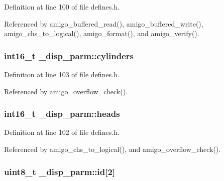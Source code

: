 Definition at line 100 of file defines.\+h.



Referenced by amigo\+\_\+buffered\+\_\+read(), amigo\+\_\+buffered\+\_\+write(), amigo\+\_\+chs\+\_\+to\+\_\+logical(), amigo\+\_\+format(), and amigo\+\_\+verify().

\subsubsection[{\texorpdfstring{cylinders}{cylinders}}]{\setlength{\rightskip}{0pt plus 5cm}int16\+\_\+t \+\_\+disp\+\_\+parm\+::cylinders}\hypertarget{struct__disp__parm_ac4687d407f95a65e86313cde433832a4}{}\label{struct__disp__parm_ac4687d407f95a65e86313cde433832a4}


Definition at line 103 of file defines.\+h.



Referenced by amigo\+\_\+overflow\+\_\+check().

\subsubsection[{\texorpdfstring{heads}{heads}}]{\setlength{\rightskip}{0pt plus 5cm}int16\+\_\+t \+\_\+disp\+\_\+parm\+::heads}\hypertarget{struct__disp__parm_a013e3f25cec51e3edfae124ed5d22cb9}{}\label{struct__disp__parm_a013e3f25cec51e3edfae124ed5d22cb9}


Definition at line 102 of file defines.\+h.



Referenced by amigo\+\_\+chs\+\_\+to\+\_\+logical(), and amigo\+\_\+overflow\+\_\+check().

\subsubsection[{\texorpdfstring{id}{id}}]{\setlength{\rightskip}{0pt plus 5cm}uint8\+\_\+t \+\_\+disp\+\_\+parm\+::id\mbox{[}2\mbox{]}}\hypertarget{struct__disp__parm_adc781d8c48b2aa39c092fcb206f15e8c}{}\label{struct__disp__parm_adc781d8c48b2aa39c092fcb206f15e8c}



